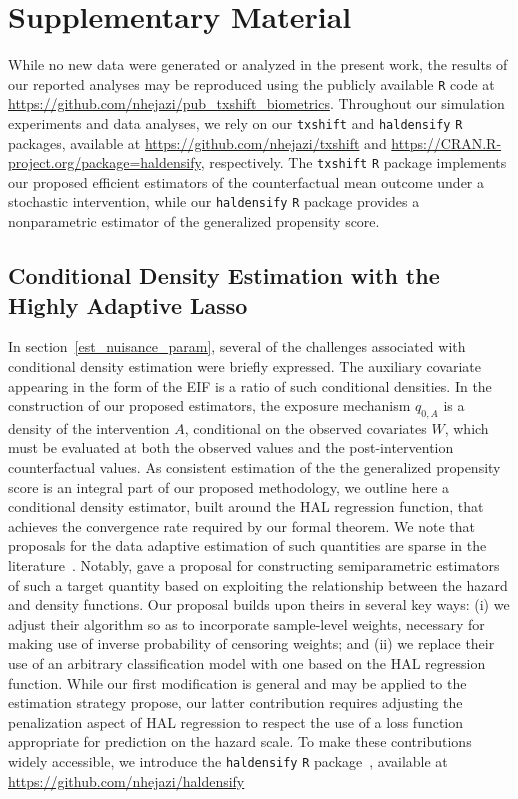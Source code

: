 \section{Supplementary Material}\label{two_sm}

While no new data were generated or analyzed in the present work, the results of
our reported analyses may be reproduced using the publicly available \texttt{R}
code at \url{https://github.com/nhejazi/pub_txshift_biometrics}. Throughout our
simulation experiments and data analyses, we rely on our \texttt{txshift} and
\texttt{haldensify} \texttt{R} packages, available at
\url{https://github.com/nhejazi/txshift} and
\url{https://CRAN.R-project.org/package=haldensify}, respectively. The
\texttt{txshift} \texttt{R} package implements our proposed efficient estimators
of the counterfactual mean outcome under a stochastic intervention, while our
\texttt{haldensify} \texttt{R} package provides a nonparametric estimator of the
generalized propensity score.

\subsection{Conditional Density Estimation with the Highly Adaptive
Lasso}\label{cond_dens}

In section~\ref{est_nuisance_param}, several of the challenges associated
with conditional density estimation were briefly expressed. The auxiliary
covariate appearing in the form of the EIF is a ratio of such conditional
densities. In the construction of our proposed estimators, the exposure
mechanism $q_{0,A}$ is a density of the intervention $A$, conditional on the
observed covariates $W$, which must be evaluated at both the observed values and
the post-intervention counterfactual values. As consistent estimation of the the
generalized propensity score is an integral part of our proposed methodology, we
outline here a conditional density estimator, built around the HAL regression
function, that achieves the convergence rate required by our formal theorem. We
note that proposals for the data adaptive estimation of such quantities are
sparse in the literature~\citep[e.g.,][]{zhu2015boosting}. Notably,
\citet{diaz2011super} gave a proposal for constructing semiparametric estimators
of such a target quantity based on exploiting the relationship between the
hazard and density functions. Our proposal builds upon theirs in several key
ways: (i) we adjust their algorithm so as to incorporate sample-level weights,
necessary for making use of inverse probability of censoring weights; and (ii)
we replace their use of an arbitrary classification model with one based on the
HAL regression function. While our first modification is general and may be
applied to the estimation strategy \citet{diaz2011super} propose, our latter
contribution requires adjusting the penalization aspect of HAL regression to
respect the use of a loss function appropriate for prediction on the hazard
scale. To make these contributions widely accessible, we introduce the
\texttt{haldensify} \texttt{R} package~\citep{hejazi2021haldensify}, available
at \url{https://github.com/nhejazi/haldensify}

